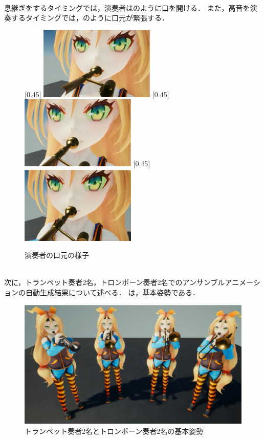 \\
息継ぎをするタイミングでは，演奏者はのように口を開ける．
また，高音を演奏するタイミングでは，のように口元が緊張する．
\vspace{-2mm}
\begin{figure}[h]
	\centering
	[0.45\linewidth]{
		\includegraphics[width=5.5cm]{fig/chap4/anim1_zoom_breath.eps}}
	[0.45\linewidth]{
		\includegraphics[width=5.5cm]{fig/chap4/anim1_zoom_high.eps}}
	[0.45\linewidth]{
		\includegraphics[width=5.5cm]{fig/chap4/anim1_zoom.eps}}
	\caption{演奏者の口元の様子}
	\label{fig:zoom}
\end{figure}
\\
\indent
次に，トランペット奏者2名，トロンボーン奏者2名でのアンサンブルアニメーションの自動生成結果について述べる．
は，基本姿勢である．
\begin{figure}[h]
	\centering
	\includegraphics[width=13cm]{fig/chap4/anim2.eps}
	\caption{トランペット奏者2名とトロンボーン奏者2名の基本姿勢}
	\label{fig:anim2}
\end{figure}
